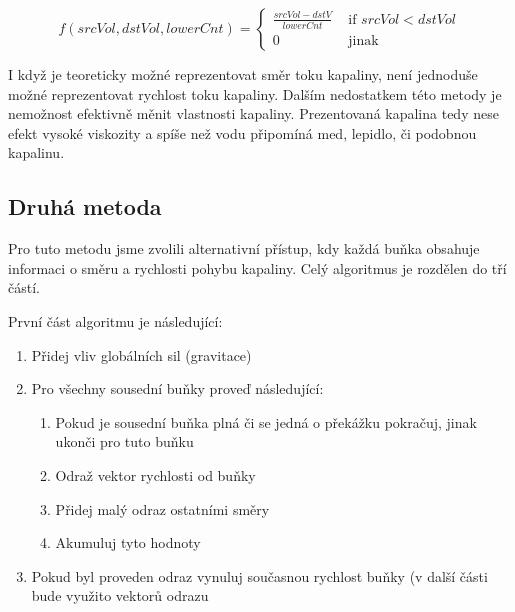 \documentclass[12pt,a4paper,titlepage,final]{report}
\begin{document}

\begin{equation}
f(srcVol, dstVol, lowerCnt) = \left\{ \begin{array}{rl}
\frac{srcVol - dstV}{lowerCnt} &\mbox{ if $srcVol < dstVol$} \\
0 &\mbox{ jinak}
\end{array} \right.
    \label{eq:cell_hori}
\end{equation}

I když je teoreticky možné reprezentovat směr toku kapaliny, není jednoduše možné reprezentovat rychlost toku kapaliny. Dalším nedostatkem této metody je nemožnost efektivně měnit vlastnosti kapaliny. Prezentovaná kapalina tedy nese efekt vysoké viskozity a spíše než vodu připomíná med, lepidlo, či podobnou kapalinu.

\subsection{Druhá metoda}
Pro tuto metodu jsme zvolili alternativní přístup, kdy každá buňka obsahuje informaci o směru a rychlosti pohybu kapaliny. Celý algoritmus je rozdělen do tří částí.

První část algoritmu je následující:
\begin{enumerate}
    \item Přidej vliv globálních sil (gravitace)
    \item Pro všechny sousední buňky proveď následující:
    \begin{enumerate}
        \item Pokud je sousední buňka plná či se jedná o překážku pokračuj, jinak ukonči pro tuto buňku
        \item Odraž vektor rychlosti od buňky
        \item Přidej malý odraz ostatními směry
        \item Akumuluj tyto hodnoty
    \end{enumerate}
    \item Pokud byl proveden odraz vynuluj současnou rychlost buňky (v další části bude využito vektorů odrazu
\end{enumerate}
\end{document}
